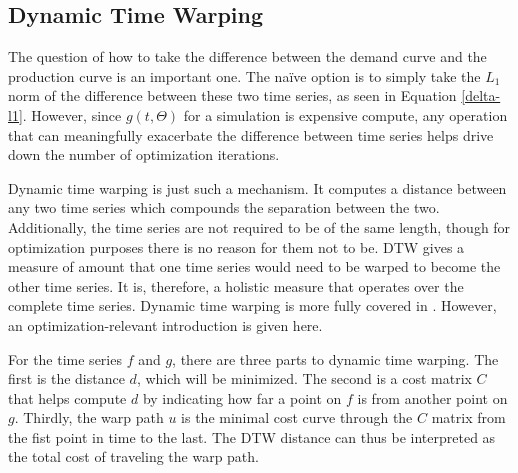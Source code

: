 \subsection{Dynamic Time Warping}
\label{dtw}

The question of how to take the difference between the demand curve and 
the production curve is an important one. The na\"ive option is to simply 
take the $L_1$ norm of the difference between these two time series, as 
seen in Equation \ref{delta-l1}.  However, since $g(t, \Theta)$ for 
a simulation is expensive compute, any operation that can meaningfully 
exacerbate the difference between time series helps drive down the number 
of optimization iterations.

Dynamic time warping is just such a mechanism. It computes 
a distance between any two time series which compounds the separation 
between the two. Additionally, the time series are not required to be of the 
same length, though for optimization purposes there is no reason for them 
not to be. DTW gives a measure of amount that one time series would need to 
be warped to become the other time series. It is, therefore, a holistic  
measure that operates over the complete time series. Dynamic time warping
is more fully covered in \cite{muller}.  However, an 
optimization-relevant introduction is given here.

For the time series $f$ and $g$, there are three parts to dynamic time 
warping. The first is the distance $d$, which will be minimized. The second 
is a cost matrix $C$ that helps compute $d$ by indicating how far a point 
on $f$ is from another point on $g$. Thirdly, the warp path $u$ is the 
minimal cost curve through the $C$ matrix from the fist point in time to 
the last. The DTW distance can thus be interpreted as the 
total cost of traveling the warp path.

